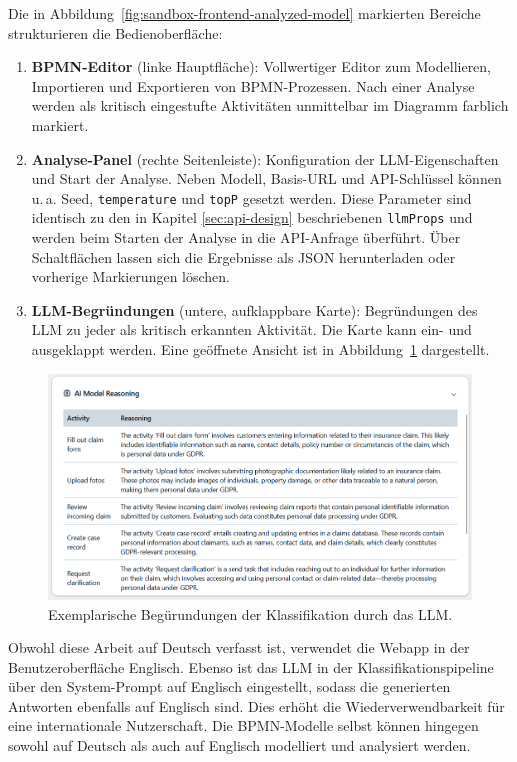 Die in Abbildung~\ref{fig:sandbox-frontend-analyzed-model} markierten Bereiche strukturieren die Bedienoberfläche:

\begin{enumerate}
    \item \textbf{BPMN-Editor} (linke Hauptfläche): Vollwertiger Editor zum Modellieren, Importieren und Exportieren von \ac{BPMN}-Prozessen. Nach einer Analyse werden als kritisch eingestufte Aktivitäten unmittelbar im Diagramm farblich markiert.
    \item \textbf{Analyse-Panel} (rechte Seitenleiste): Konfiguration der \ac{LLM}-Eigenschaften und Start der Analyse. Neben Modell, Basis-URL und API-Schlüssel können u.\,a. Seed, \texttt{temperature} und \texttt{topP} gesetzt werden. Diese Parameter sind identisch zu den in Kapitel \ref{sec:api-design} beschriebenen \texttt{llmProps} und werden beim Starten der Analyse in die API-Anfrage überführt. Über Schaltflächen lassen sich die Ergebnisse als JSON herunterladen oder vorherige Markierungen löschen.
    \item \textbf{\ac{LLM}-Begründungen} (untere, aufklappbare Karte): Begründungen des \ac{LLM} zu jeder als kritisch erkannten Aktivität. Die Karte kann ein- und ausgeklappt werden. Eine geöffnete Ansicht ist in Abbildung~\ref{fig:sandbox-frontend-ai-reasoning} dargestellt.
\end{enumerate}

\begin{figure}[h]
    \centering
    \includegraphics[width=.92\linewidth]{images/sandbox/sandbox-ai-reasoning}
    \caption{Exemplarische Begürundungen der Klassifikation durch das LLM.}
    \label{fig:sandbox-frontend-ai-reasoning}
\end{figure}

Obwohl diese Arbeit auf Deutsch verfasst ist, verwendet die Webapp in der Benutzeroberfläche Englisch. Ebenso ist das \ac{LLM} in der Klassifikationspipeline über den System-Prompt auf Englisch eingestellt, sodass die generierten Antworten ebenfalls auf Englisch sind. Dies erhöht die Wiederverwendbarkeit für eine internationale Nutzerschaft. Die \ac{BPMN}-Modelle selbst können hingegen sowohl auf Deutsch als auch auf Englisch modelliert und analysiert werden.